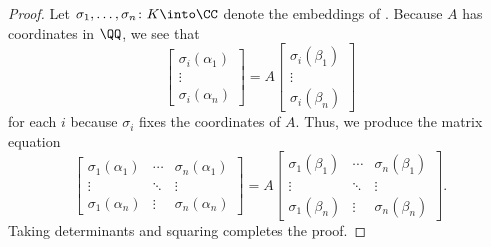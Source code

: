 \documentclass[../notes.tex]{subfiles}
\begin{document}
\begin{proof}
	Let $\sigma_1,\ldots,\sigma_n\colon K\into\CC$ denote the embeddings of . Because $A$ has coordinates in $\QQ$, we see that
	\[\begin{bmatrix}
		\sigma_i(\alpha_1) \\
		\vdots \\
		\sigma_i(\alpha_n)
	\end{bmatrix}=A\begin{bmatrix}
		\sigma_i(\beta_1) \\
		\vdots \\
		\sigma_i(\beta_n)
	\end{bmatrix}\]
	for each $i$ because $\sigma_i$ fixes the coordinates of $A$. Thus, we produce the matrix equation
	\[\begin{bmatrix}
		\sigma_1(\alpha_1) & \cdots & \sigma_n(\alpha_1) \\
		\vdots & \ddots & \vdots \\
		\sigma_1(\alpha_n) & \vdots & \sigma_n(\alpha_n)
	\end{bmatrix}=A\begin{bmatrix}
		\sigma_1(\beta_1) & \cdots & \sigma_n(\beta_1) \\
		\vdots & \ddots & \vdots \\
		\sigma_1(\beta_n) & \vdots & \sigma_n(\beta_n)
	\end{bmatrix}.\]
	Taking determinants and squaring completes the proof.
\end{proof}
\end{document}

